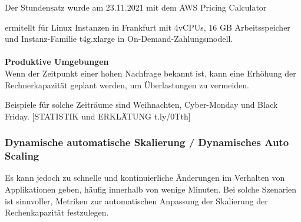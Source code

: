 Der Stundensatz wurde am 23.11.2021 mit dem AWS Pricing Calculator{\cite{AMZ17} ermitellt für Linux Instanzen in Frankfurt mit 4vCPUs, 16 GB Arbeitsspeicher und Instanz-Familie t4g.xlarge in On-Demand-Zahlungsmodell.
\\\\
\textbf{Produktive Umgebungen}\\
Wenn der Zeitpunkt einer hohen Nachfrage bekannt ist, kann eine Erhöhung der Rechnerkapazität geplant werden, um Überlastungen zu vermeiden.

Beispiele für solche Zeiträume sind Weihnachten, Cyber-Monday und Black Friday. 
[STATISTIK und ERKLÄTUNG t.ly/0Tth]

\subsubsection{Dynamische automatische Skalierung / Dynamisches Auto Scaling}
Es kann jedoch zu schnelle und kontinuierliche Änderungen im Verhalten von Applikationen geben, häufig innerhalb von wenige Minuten. Bei solche Szenarien ist sinnvoller, Metriken zur automatischen Anpassung der Skalierung der Rechenkapazität festzulegen.

}
